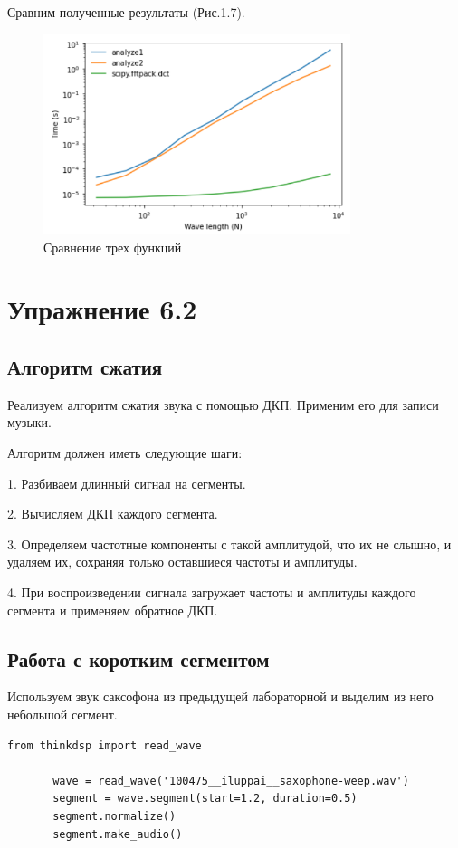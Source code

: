 \documentclass[a4paper,12pt]{report}
\begin{document}
    Сравним полученные результаты (Рис.1.7).
\begin{figure}[H]
        \centering
        \includegraphics[width=0.8\textwidth]{fig1-7.PNG}
        \caption{Сравнение трех функций}
        \label{fig:fig1-7}
\end{figure}

\chapter{Упражнение 6.2}
\section{Алгоритм сжатия}
    Реализуем алгоритм сжатия звука с помощью ДКП. Применим его для записи музыки. 
    
    Алгоритм должен иметь следующие шаги:

    1. Разбиваем длинный сигнал на сегменты.
    
    2. Вычисляем ДКП каждого сегмента.
    
    3. Определяем частотные компоненты с такой амплитудой, что их не слышно, и удаляем их, сохраняя только оставшиеся частоты и амплитуды.
    
    4. При воспроизведении сигнала загружает частоты и амплитуды каждого сегмента и применяем обратное ДКП.

\section{Работа с коротким сегментом}
    Используем звук саксофона из предыдущей лабораторной и выделим из него небольшой сегмент.
\begin{lstlisting}[caption=Выделение сегмента]
       from thinkdsp import read_wave

       wave = read_wave('100475__iluppai__saxophone-weep.wav')
       segment = wave.segment(start=1.2, duration=0.5)
       segment.normalize()
       segment.make_audio()
\end{lstlisting}
\end{document}
